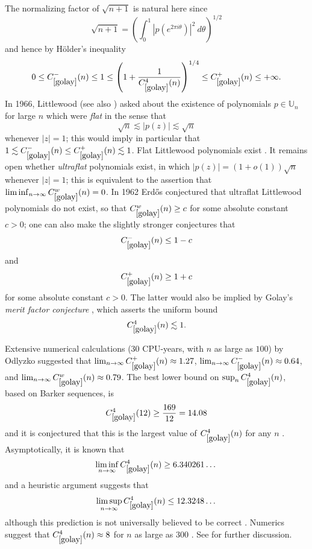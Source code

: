 The normalizing factor of $\sqrt{n+1}$ is natural here since
$$ \sqrt{n+1} = \left( \int_0^1 |p(e^{2\pi i \theta})|^2\ d\theta\right)^{1/2}$$
and hence by H\"older's inequality
$$ 0 \leq C_{\ref{golay}}^-(n) \leq 1 \leq \left(1 + \frac{1}{C_{\ref{golay}}^4(n)}\right)^{1/4} \leq C_{\ref{golay}}^+(n)  \leq +\infty.$$ 
In 1966, Littlewood \cite{Littlewood1966} (see also \cite[Problem 84]{green-open}) asked about the existence of polynomials $p \in \mathbb{U}_n$ for large $n$ which were \emph{flat} in the sense that
$$ \sqrt{n} \lesssim |p(z)| \lesssim \sqrt{n}$$
whenever $|z| = 1$; this would imply in particular that $1 \lesssim C_{\ref{golay}}^-(n) \leq C_{\ref{golay}}^+(n) \lesssim 1$.  Flat Littlewood polynomials exist \cite{balisteretal}.  It remains open whether \emph{ultraflat} polynomials exist, in which $|p(z)| = (1+o(1))\sqrt{n}$ whenever $|z|=1$; this is equivalent to the assertion that $\liminf_{n \to \infty} C_{\ref{golay}}^w(n) = 0$.  In 1962 Erd\H{o}s \cite{erdos-flat} conjectured that ultraflat Littlewood polynomials do not exist, so that $C_{\ref{golay}}^w(n) \geq c$ for some absolute constant $c>0$; one can also make the slightly stronger conjectures that
$$ C_{\ref{golay}}^-(n) \leq 1-c$$
and
$$ C_{\ref{golay}}^+(n) \geq 1+c $$
for some absolute constant $c>0$.  The latter would also be implied by Golay's \emph{merit factor conjecture} \cite{Golay1977}, which asserts the uniform bound
$$ C_{\ref{golay}}^4(n) \lesssim 1. $$

Extensive numerical calculations (30 CPU-years, with $n$ as large as $100$) by  Odlyzko \cite{odlyzko} suggested that $\lim_{n \to \infty} C_{\ref{golay}}^+(n) \approx 1.27$, $\lim_{n \to \infty} C_{\ref{golay}}^-(n) \approx 0.64$, and $\lim_{n \to \infty} C_{\ref{golay}}^w(n) \approx 0.79$.  The best lower bound on $\sup_n C_{\ref{golay}}^4(n)$, based on Barker sequences, is
$$ C_{\ref{golay}}^4(12) \geq \frac{169}{12} = 14.08$$
and it is conjectured that this is the largest value of $C_{\ref{golay}}^4(n)$ for any $n$ \cite[\S 2]{odlyzko}.  Asymptotically, it is known \cite{jedwab} that
$$ \liminf_{n \to \infty} C_{\ref{golay}}^4(n) \geq 6.340261\dots$$
and a heuristic argument \cite{golay} suggests that
$$ \limsup_{n \to \infty} C_{\ref{golay}}^4(n) \leq 12.3248\dots$$
although this prediction is not universally believed to be correct \cite[\S 2]{odlyzko}. Numerics suggest that $C_{\ref{golay}}^4(n) \approx 8$ for $n$ as large as $300$ \cite{packebusch}.  See \cite{borwein-mossinghoff} for further discussion.



